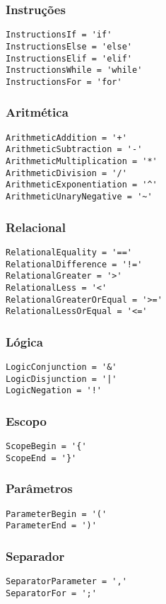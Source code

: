 \documentclass[a4paper,12pt]{article}
\begin{document}
\hfill

\subsubsection*{Instruções}
\begin{lstlisting}
InstructionsIf = 'if'
InstructionsElse = 'else'
InstructionsElif = 'elif'
InstructionsWhile = 'while'
InstructionsFor = 'for'
\end{lstlisting}

\hfill

\subsubsection*{Aritmética}
\begin{lstlisting}
ArithmeticAddition = '+'
ArithmeticSubtraction = '-'
ArithmeticMultiplication = '*'
ArithmeticDivision = '/'
ArithmeticExponentiation = '^'
ArithmeticUnaryNegative = '~'
\end{lstlisting}

\hfill

\subsubsection*{Relacional}
\begin{lstlisting}
RelationalEquality = '=='
RelationalDifference = '!='
RelationalGreater = '>'
RelationalLess = '<'
RelationalGreaterOrEqual = '>='
RelationalLessOrEqual = '<='
\end{lstlisting}

\hfill

\subsubsection*{Lógica}
\begin{lstlisting}
LogicConjunction = '&'
LogicDisjunction = '|'
LogicNegation = '!'
\end{lstlisting}

\hfill

\subsubsection*{Escopo}
\begin{lstlisting}
ScopeBegin = '{'
ScopeEnd = '}'
\end{lstlisting}

\hfill

\subsubsection*{Parâmetros}
\begin{lstlisting}
ParameterBegin = '('
ParameterEnd = ')'
\end{lstlisting}

\hfill

\subsubsection*{Separador}
\begin{lstlisting}
SeparatorParameter = ','
SeparatorFor = ';'
\end{lstlisting}
\end{document}
